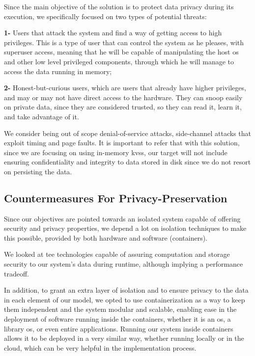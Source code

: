 Since the main objective of the solution is to protect data privacy during its execution, we specifically focused on two types of potential threats: 

\textbf{1-} Users that attack the system and find a way of getting access to high privileges. This is a type of user that can control the system as he pleases, with superuser access, meaning that he will be capable of manipulating the host \gls{os} and other low level privileged components, through which he will manage to access the data running in memory;

\textbf{2-}  Honest-but-curious users, which are users that already have higher privileges, and may or may not have direct access to the hardware. They can snoop easily on private data, since they are considered trusted, so they can read it, learn it, and take advantage of it.

We consider being out of scope denial-of-service attacks, side-channel attacks that exploit timing and page faults.
It is important to refer that with this solution, since we are focusing on using in-memory \gls{kvs}s, our target will not include ensuring confidentiality and integrity to data stored in disk since we do not resort on persisting the data.

\subsection{Countermeasures For Privacy-Preservation}

Since our objectives are pointed towards an isolated system capable of offering security
and privacy properties, we depend a lot on isolation techniques to make this possible,
provided by both hardware and software (containers).

We looked at \gls{tee} technologies capable of assuring computation and storage security to our system's data during runtime, although implying a performance tradeoff. 

In addition, to grant an extra layer of isolation and to ensure privacy to the data in each element of our model, we opted to use containerization as a way to keep them independent and the system modular and scalable, enabling ease in the deployment of software running inside the containers, whether it is an \gls{os}, a library
\gls{os}, or even entire applications. Running our system inside containers allows it to be deployed in a very similar way, whether running locally or in the cloud, which can be very helpful in the implementation process. 





